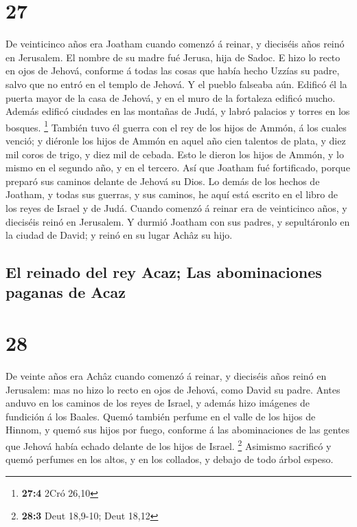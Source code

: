 \hypertarget{section-26}{%
\section{27}\label{section-26}}

 De veinticinco años era Joatham cuando comenzó á reinar, y
dieciséis años reinó en Jerusalem. El nombre de su madre fué Jerusa,
hija de Sadoc.  E hizo lo recto en ojos de Jehová, conforme
á todas las cosas que había hecho Uzzías su padre, salvo que no entró en
el templo de Jehová. Y el pueblo falseaba aún.  Edificó él
la puerta mayor de la casa de Jehová, y en el muro de la fortaleza
edificó mucho.  Además edificó ciudades en las montañas de
Judá, y labró palacios y torres en los bosques. \footnote{\textbf{27:4}
  2Cró 26,10}  También tuvo él guerra con el rey de los
hijos de Ammón, á los cuales venció; y diéronle los hijos de Ammón en
aquel año cien talentos de plata, y diez mil coros de trigo, y diez mil
de cebada. Esto le dieron los hijos de Ammón, y lo mismo en el segundo
año, y en el tercero.  Así que Joatham fué fortificado,
porque preparó sus caminos delante de Jehová su Dios.  Lo
demás de los hechos de Joatham, y todas sus guerras, y sus caminos, he
aquí está escrito en el libro de los reyes de Israel y de Judá.
 Cuando comenzó á reinar era de veinticinco años, y
dieciséis reinó en Jerusalem.  Y durmió Joatham con sus
padres, y sepultáronlo en la ciudad de David; y reinó en su lugar Achâz
su hijo.

\hypertarget{el-reinado-del-rey-acaz-las-abominaciones-paganas-de-acaz}{%
\subsection{El reinado del rey Acaz; Las abominaciones paganas de
Acaz}\label{el-reinado-del-rey-acaz-las-abominaciones-paganas-de-acaz}}

\hypertarget{section-27}{%
\section{28}\label{section-27}}

 De veinte años era Achâz cuando comenzó á reinar, y
dieciséis años reinó en Jerusalem: mas no hizo lo recto en ojos de
Jehová, como David su padre.  Antes anduvo en los caminos de
los reyes de Israel, y además hizo imágenes de fundición á los Baales.
 Quemó también perfume en el valle de los hijos de Hinnom, y
quemó sus hijos por fuego, conforme á las abominaciones de las gentes
que Jehová había echado delante de los hijos de Israel. \footnote{\textbf{28:3}
  Deut 18,9-10; Deut 18,12}  Asimismo sacrificó y quemó
perfumes en los altos, y en los collados, y debajo de todo árbol espeso.

